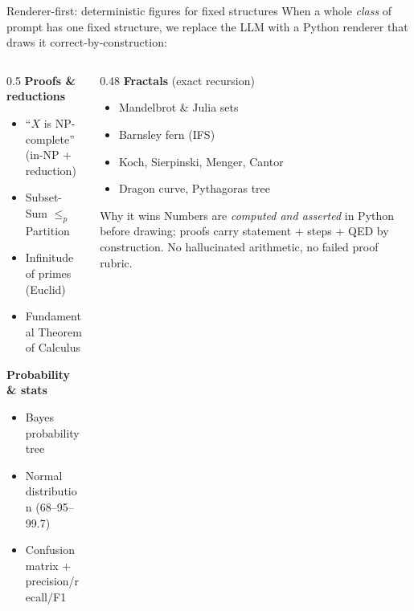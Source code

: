 \documentclass[aspectratio=169,11pt]{beamer}
\begin{document}
\begin{frame}{Renderer-first: deterministic figures for fixed structures}
  When a whole \emph{class} of prompt has one fixed structure, we replace
  the LLM with a Python renderer that draws it correct-by-construction:
  \vspace{1mm}
  \begin{columns}[T]
  \begin{column}{0.5\textwidth}\footnotesize
    \textbf{Proofs \& reductions}
    \begin{itemize}\itemsep1pt
      \item ``$X$ is NP-complete'' (in-NP + reduction)
      \item Subset-Sum $\le_p$ Partition
      \item Infinitude of primes (Euclid)
      \item Fundamental Theorem of Calculus
    \end{itemize}
    \textbf{Probability \& stats}
    \begin{itemize}\itemsep1pt
      \item Bayes probability tree
      \item Normal distribution (68--95--99.7)
      \item Confusion matrix + precision/recall/F1
    \end{itemize}
  \end{column}
  \begin{column}{0.48\textwidth}\footnotesize
    \textbf{Fractals} (exact recursion)
    \begin{itemize}\itemsep1pt
      \item Mandelbrot \& Julia sets
      \item Barnsley fern (IFS)
      \item Koch, Sierpinski, Menger, Cantor
      \item Dragon curve, Pythagoras tree
    \end{itemize}
    \vspace{2mm}
    \begin{block}{\footnotesize Why it wins}
    \scriptsize Numbers are \emph{computed and asserted} in Python before
    drawing; proofs carry statement + steps + QED by construction. No
    hallucinated arithmetic, no failed proof rubric.
    \end{block}
  \end{column}
  \end{columns}
\end{frame}
\end{document}
